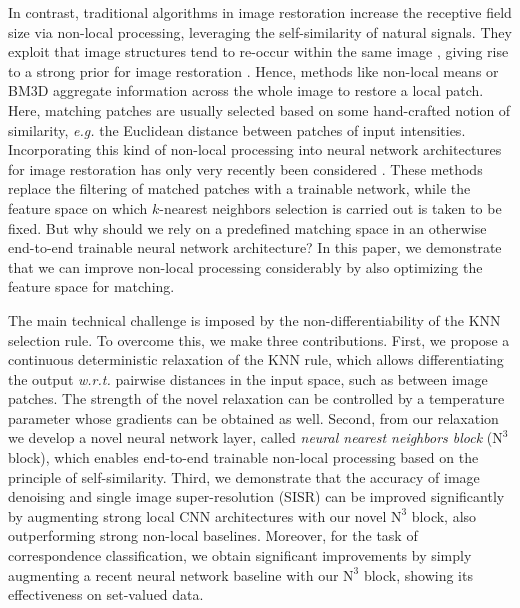 \documentclass{article}
\makeatletter
\newcommand{\eg}{\emph{e.\thinspace{}g.}\@\xspace}
\newcommand{\wrt}{\emph{w.\thinspace{}r.\thinspace{}t.}\@\xspace}
\newcommand\kk{k}
\newcommand\nnn{\text{N}^3}
\makeatother
\begin{document}
In contrast, traditional algorithms in image restoration increase the receptive field size via non-local processing, leveraging the self-similarity of natural signals.
They exploit that image structures tend to re-occur within the same image \cite{Zontak:2011:ISS}, giving rise to a strong prior for image restoration \cite{Lotan:2016:NMR}.
Hence, methods like non-local means \cite{Buades:2005:NLA} or BM3D \cite{Dabov:2006:IDB} aggregate information across the whole image to restore a local patch. 
Here, matching patches are usually selected based on some hand-crafted notion
of similarity, \eg the Euclidean distance between patches of input intensities. 
Incorporating this kind of non-local processing into neural network architectures for image restoration has only very recently been considered \cite{Lefkimmiatis:2017:NLC,Yang:2018:BM3D}. 
These methods replace the filtering of matched patches with a trainable network, while the feature space on which $\kk$-nearest neighbors selection is carried out is taken to be fixed. 
But why should we rely on a predefined matching space in an otherwise end-to-end trainable neural network architecture? 
In this paper, we demonstrate that we can improve non-local processing
considerably by also optimizing the feature space for matching.

The main technical challenge is imposed by the non-differentiability of the KNN selection rule.
To overcome this, we make three contributions.
First, we propose a continuous deterministic relaxation of the KNN rule,
which allows differentiating the output \wrt pairwise distances in the input space, such as between image patches. 
The strength of the novel relaxation can be controlled by a temperature parameter whose gradients can be obtained as well. 
Second, from our relaxation we develop a novel neural network layer,
called  \emph{neural nearest neighbors block} ($\nnn$ block), which enables end-to-end trainable non-local processing based on the principle
of self-similarity.
Third, we demonstrate that the accuracy of image denoising and single image super-resolution (SISR) can be improved significantly by augmenting strong local CNN architectures with our novel $\nnn$ block, also outperforming strong non-local baselines.
Moreover, for the task of correspondence classification, we obtain significant improvements by simply augmenting a recent neural network baseline with our $\nnn$ block, showing its effectiveness on set-valued data.
\end{document}
